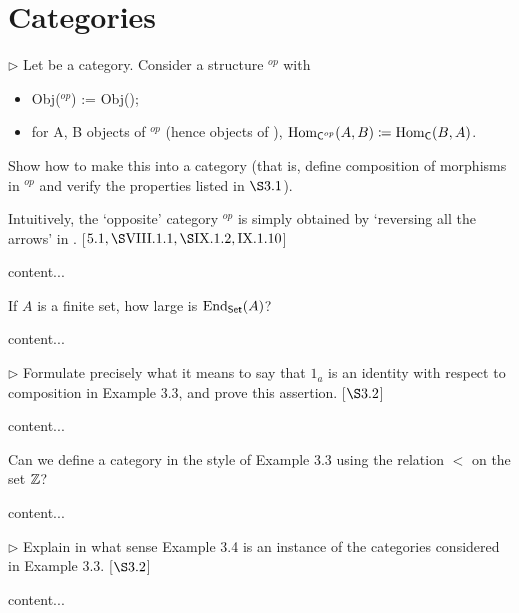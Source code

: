 \section{Categories}
\extitle

\begin{exercise}
	\(\triangleright\) Let  be a category. Consider a structure \(^{op}\) with
	\begin{itemize}
		\item 
		Obj(\(^{op}\)) := Obj();
		\item
		for A, B objects of \(^{op}\) (hence objects of ), \(\Hom_{\text{\serif{C}}^{op}}(A,B) \defeq \Hom_{\text{\serif{C}}}(B,A)\).
	\end{itemize}
	Show how to make this into a category (that is, define composition of morphisms in \(^{op}\) and verify the properties listed in \(\S 3.1\)).
	
	Intuitively, the ‘opposite’ category \(^{op}\) is simply obtained by ‘reversing all the arrows’ in . [\(5.1, \S \RN{8}.1.1, \S \RN{9}.1.2, \RN{9}.1.10\)]
\end{exercise}
\begin{solution}
	content...
\end{solution}

\begin{exercise}
	If \(A\) is a finite set, how large is \(\End_{\text{\serif{Set}}}(A)\)?
\end{exercise}
\begin{solution}
	content...
\end{solution}

\begin{exercise}
	\(\triangleright\) Formulate precisely what it means to say that \(1_a\) is an identity with respect to composition in Example 3.3, and prove this assertion. [\(\S 3.2\)]
\end{exercise}
\begin{solution}
	content...
\end{solution}

\begin{exercise}
	Can we define a category in the style of Example 3.3 using the relation \(<\) on the set \(\mathbb{Z}\)?
\end{exercise}
\begin{solution}
	content...
\end{solution}

\begin{exercise}
	\(\triangleright\) Explain in what sense Example 3.4 is an instance of the categories considered in Example 3.3. [\(\S 3.2\)]
\end{exercise}
\begin{solution}
	content...
\end{solution}

